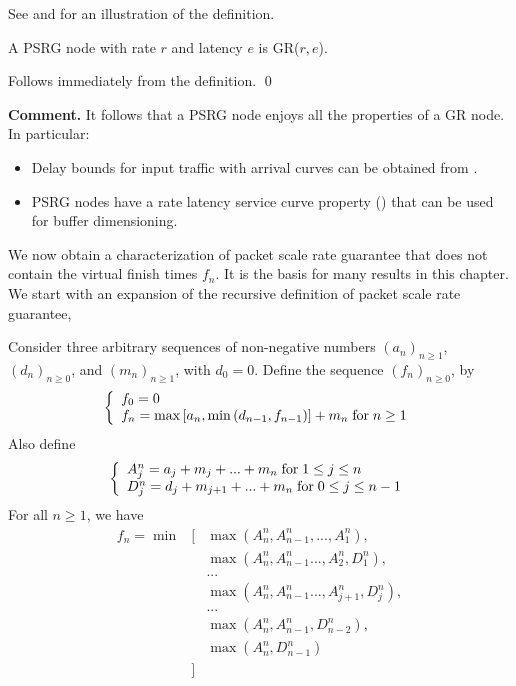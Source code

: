 See  and  for an
illustration of the definition.

\begin{figure}[!htbp]
\end{figure}

\begin{figure}[!htbp]
\end{figure}

\begin{theorem}
A PSRG node with rate $r$ and latency $e$ is GR($r,e$).
\end{theorem}
\pr Follows immediately from the definition. \qed

\textbf{Comment.} It follows that a PSRG node enjoys all the
properties of a GR node. In particular:
\begin{itemize}
  \item Delay bounds for input traffic with arrival curves can
  be obtained from .
  \item PSRG nodes have a  rate latency service curve property ()
  that can be used for buffer dimensioning.
\end{itemize}

We now obtain a characterization of packet scale rate
guarantee that does not contain the virtual finish times
$f_n$. It is the basis for many results in this chapter. We
start with an expansion of the recursive definition of packet
scale rate guarantee,

\begin{lemma}
 Consider three arbitrary sequences
of non-negative numbers $(a_n)_{n \geq 1}$, $(d_n)_{n \geq
0}$, and $(m_n)_{n \geq 1}$, with $d_0 =0$. Define the
sequence $(f_n)_{n\geq 0}$, by
$$\left\{\begin{array}{l} 
 f_0 =0\\
 f_n = \max \left[a_n, \min \left(d_{n-1}, f_{n-1} \right)\right] + m_n \mathrm{\; for \; }
 n \geq 1
  \end{array} \right.
$$
Also define
$$
 \left\{\begin{array}{l} 
 A^n_j=a_j +  m_j + ... + m_n \mathrm{\; for \; } 1 \leq j\leq n\\
 D^n_j=d_j + m_{j+1} + ... + m_n \mathrm{\; for \; } 0 \leq j\leq n -1
  \end{array} \right.
$$
For all $n \geq 1$, we have
  \begin{eqnarray*}
    f_n  = \min & [ & \max(A_n^n , A_{n-1}^n , ... ,
    A_1^n),\\
 &&  \max(A_n^n , A_{n-1}^n ... , A_2^n , D_1^n),\\
 &&    ...\\
  &&  \max(A_n^n , A_{n-1}^n ... , A_{j+1}^n , D_j^n),\\
  &&   ...\\
 &&  \max(A_n^n , A_{n-1}^n , D_{n-2}^n),\\
 && \max(A_n^n , D_{n-1}^n)\\
 & ]\end{eqnarray*}
\end{lemma}

